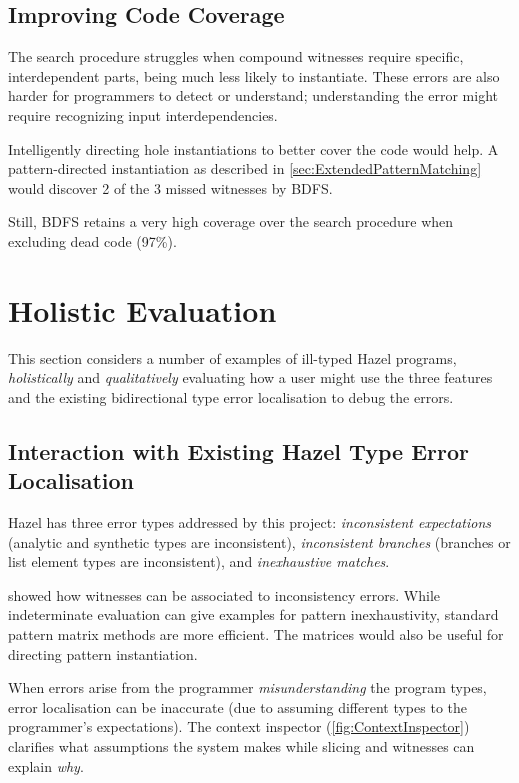 \subsection{Improving Code Coverage}
\label{sec:EvalHoleInstantiation}
The search procedure struggles when compound witnesses require specific, interdependent parts, being much less likely to instantiate. These errors are also harder for programmers to detect or understand; understanding the error might require recognizing input interdependencies.

Intelligently directing hole instantiations to better cover the code would help. A pattern-directed instantiation as described in \cref{sec:ExtendedPatternMatching} would discover 2 of the 3 missed witnesses by BDFS.

Still, BDFS retains a very high coverage over the search procedure when excluding dead code (97\%).

\section{Holistic Evaluation}
\label{sec:HolisticEvaluation}

This section considers a number of examples of ill-typed Hazel programs, \textit{holistically} and \textit{qualitatively} evaluating how a user might use the three features and the existing bidirectional type error localisation \cite{MarkedLocalisation} to debug the errors. 


\subsection{Interaction with Existing Hazel Type Error Localisation}
Hazel has three error types addressed by this project: \textit{inconsistent expectations} (analytic and synthetic types are inconsistent), \textit{inconsistent branches }(branches or list element types are inconsistent), and \textit{inexhaustive matches}. 

 showed how witnesses can be associated to inconsistency errors. While indeterminate evaluation can give examples for pattern inexhaustivity, standard pattern matrix methods \cite{PatternMatchingWarnings} are more efficient. The matrices would also be useful for directing pattern instantiation.

When errors arise from the programmer \textit{misunderstanding} the program types, error localisation can be inaccurate (due to assuming different types to the programmer's expectations). The context inspector (\cref{fig:ContextInspector}) clarifies what assumptions the system makes while slicing and witnesses can explain \textit{why}.

